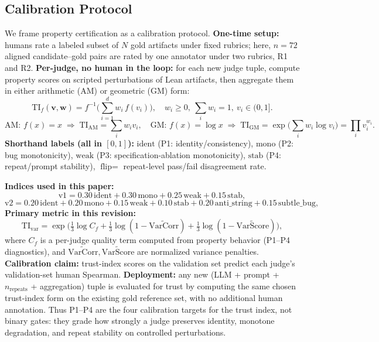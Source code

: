 \documentclass{article}
\begin{document}
\subsection{Calibration Protocol}
We frame property certification as a calibration protocol.
\textbf{One-time setup:} humans rate a labeled subset of \(N\) gold artifacts under fixed rubrics; here, \(n=72\) aligned candidate--gold pairs are rated by one annotator under two rubrics, R1 and R2.
\textbf{Per-judge, no human in the loop:} for each new judge tuple, compute property scores on scripted perturbations of Lean artifacts, then aggregate them in either arithmetic (AM) or geometric (GM) form:
\[
  \mathrm{TI}_{f}(\mathbf{v},\mathbf{w})
  =
  f^{-1}\!\Big(\sum_{i=1}^{d} w_i\, f(v_i)\Big),
  \quad
  w_i\ge 0,\ \sum_i w_i=1,\ v_i\in(0,1].
\]
\[
  \text{AM: } f(x)=x
  \;\Rightarrow\;
  \mathrm{TI}_{\mathrm{AM}}=\sum_i w_i v_i,
  \quad
  \text{GM: } f(x)=\log x
  \;\Rightarrow\;
  \mathrm{TI}_{\mathrm{GM}}=\exp\!\Big(\sum_i w_i\log v_i\Big)=\prod_i v_i^{w_i}.
\]
\textbf{Shorthand labels (all in \([0,1]\)):}
\(\text{ident}\) (P1: identity/consistency),
\(\text{mono}\) (P2: bug monotonicity),
\(\text{weak}\) (P3: specification-ablation monotonicity),
\(\text{stab}\) (P4: repeat/prompt stability),
\(\text{flip}=\) repeat-level pass/fail disagreement rate.

\textbf{Indices used in this paper:}
\[
  \text{v1} = 0.30\,\text{ident} + 0.30\,\text{mono} + 0.25\,\text{weak} + 0.15\,\text{stab},
\]
\[
  \text{v2} = 0.20\,\text{ident} + 0.20\,\text{mono} + 0.15\,\text{weak} + 0.10\,\text{stab} + 0.20\,\text{anti\_string} + 0.15\,\text{subtle\_bug},
\]
\textbf{Primary metric in this revision:}
\[
  \mathrm{TI}_{\mathrm{var}}
  =
  \exp\!\Big(\tfrac{1}{3}\log C_f
  +\tfrac{1}{3}\log(1-\widetilde{\mathrm{VarCorr}})
  +\tfrac{1}{3}\log(1-\widetilde{\mathrm{VarScore}})\Big),
\]
where \(C_f\) is a per-judge quality term computed from property behavior (P1--P4 diagnostics), and \(\widetilde{\mathrm{VarCorr}},\widetilde{\mathrm{VarScore}}\) are normalized variance penalties.
\textbf{Calibration claim:} trust-index scores on the validation set predict each judge's validation-set human Spearman.
\textbf{Deployment:} any new (LLM + prompt + \(n_\text{repeats}\) + aggregation) tuple is evaluated for trust by computing the same chosen trust-index form on the existing gold reference set, with no additional human annotation.
Thus P1--P4 are the four calibration targets for the trust index, not binary gates: they grade how strongly a judge preserves identity, monotone degradation, and repeat stability on controlled perturbations.
\end{document}
